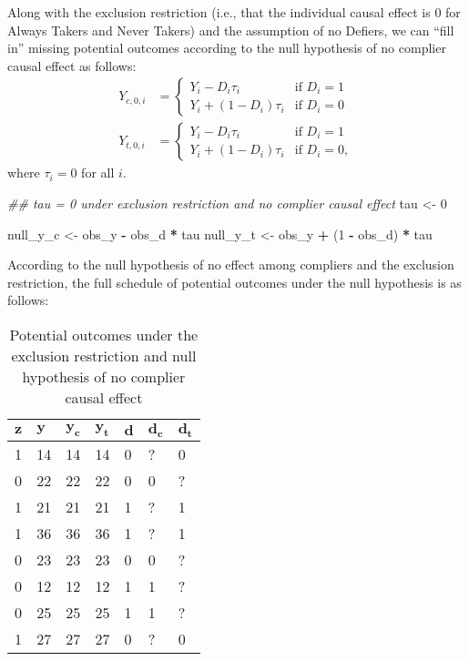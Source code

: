 \documentclass[12pt,leqno]{article}
\newenvironment{Shaded}{\begin{snugshade}}{\end{snugshade}}
\newcommand{\CommentTok}[1]{\textcolor[rgb]{0.56,0.35,0.01}{\textit{#1}}}
\newcommand{\DecValTok}[1]{\textcolor[rgb]{0.00,0.00,0.81}{#1}}
\newcommand{\NormalTok}[1]{#1}
\newcommand{\OperatorTok}[1]{\textcolor[rgb]{0.81,0.36,0.00}{\textbf{#1}}}
\newcommand{\StringTok}[1]{\textcolor[rgb]{0.31,0.60,0.02}{#1}}
\theoremstyle{newstyle}
\begin{document}
Along with the exclusion restriction (i.e., that the individual causal
effect is \(0\) for Always Takers and Never Takers) and the assumption
of no Defiers, we can \enquote{fill in} missing potential outcomes
according to the null hypothesis of no complier causal effect as
follows: \begin{align*}
Y_{c,0,i} & = 
\begin{cases}
Y_i - D_i \tau_i & \text{if } D_i = 1 \\
Y_i + \left(1 - D_i\right) \tau_i & \text{if } D_i = 0
\end{cases} \\
Y_{t,0,i} & = 
\begin{cases}
Y_i - D_i \tau_i & \text{if } D_i = 1 \\
Y_i + \left(1 - D_i\right) \tau_i & \text{if } D_i = 0,
\end{cases}
\end{align*} where \(\tau_i = 0\) for all \(i\).

\begin{Shaded}
\begin{Highlighting}[]
\CommentTok{## tau = 0 under exclusion restriction and no complier causal effect}
\NormalTok{tau <-}\StringTok{ }\DecValTok{0}

\NormalTok{null_y_c <-}\StringTok{ }\NormalTok{obs_y }\OperatorTok{-}\StringTok{ }\NormalTok{obs_d }\OperatorTok{*}\StringTok{ }\NormalTok{tau}
\NormalTok{null_y_t <-}\StringTok{ }\NormalTok{obs_y }\OperatorTok{+}\StringTok{ }\NormalTok{(}\DecValTok{1} \OperatorTok{-}\StringTok{ }\NormalTok{obs_d) }\OperatorTok{*}\StringTok{ }\NormalTok{tau}
\end{Highlighting}
\end{Shaded}

According to the null hypothesis of no effect among compliers and the
exclusion restriction, the full schedule of potential outcomes under the
null hypothesis is as follows:

\begin{table}[H]
\centering
    \begin{tabular}{l|l|l|l|l|l|l}
    $\mathbf{z}$ & $\mathbf{y}$ & $\mathbf{y_c}$ & $\mathbf{y_t}$ & $\mathbf{d}$ & $\mathbf{d_c}$ & $\mathbf{d_t}$ \\ \hline
    1 & 14 & 14 & 14 & 0 & ? & 0 \\
    0 & 22 & 22 & 22 & 0 & 0 & ? \\
    1 & 21 & 21 & 21 & 1 & ? & 1 \\
    1 & 36 & 36 & 36 & 1 & ? & 1 \\
    0 & 23 & 23 & 23 & 0 & 0 & ? \\
    0 & 12 & 12 & 12 & 1 & 1 & ? \\
    0 & 25 & 25 & 25 & 1 & 1 & ? \\
    1 & 27 & 27  & 27 & 0 & ? & 0\\
    \end{tabular}
    \caption{Potential outcomes under the exclusion restriction and null hypothesis of no complier causal effect}
    \label{tab: pot outs under null}
\end{table}
\end{document}
